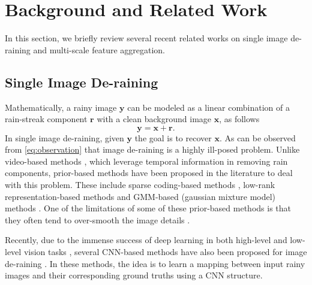 \documentclass[10pt,twocolumn,letterpaper]{article}
\begin{document}
\section{Background and Related Work}\label{sec:related}
In this section, we briefly review several recent related
works on single image de-raining and multi-scale feature aggregation.  

\subsection{Single Image De-raining}
Mathematically, a rainy image $\mathbf{y}$ can be modeled as  a linear combination of a rain-streak component $\mathbf{r}$ with a clean background image $\mathbf{x}$, as follows
\begin{equation}\label{eq:observation}
\mathbf{y}=\mathbf{x}+\mathbf{r}.
\end{equation}
In single image de-raining, given $\mathbf{y}$ the goal is to recover $\mathbf{x}$.   As can be observed from \eqref{eq:observation} that image de-raining is a highly ill-posed problem. Unlike video-based methods \cite{derain_cvpr17_video,derain_iccv17_video,derain_video_ijcv}, which leverage temporal information in removing rain components,  prior-based methods have been proposed in the literature to deal with this problem.  These include sparse coding-based methods \cite{derain_tip12,derain_tip14, derain_iccv17}, low-rank representation-based methods \cite{derain_lowrank,derain_csc_17} and GMM-based (gaussian mixture model) methods \cite{rain_2016_gmm}.  One of the limitations of some of these prior-based methods is that they often tend to over-smooth the image details \cite{derain_tip12,derain_csc_17}.   



Recently, due to the immense success of deep learning in both high-level and low-level vision tasks \cite{deep_residue,tao_stackgan_cvpr2018, zizhao_mdnet,peng_iccv17, jia_differ, style_hang},  several CNN-based methods have also been proposed for image de-raining \cite{cnn_derain2,derain_tip17,derain_cvpr2017_multi,derain_cvpr2017}.   In these methods, the idea is to learn a mapping  between input rainy images and their corresponding ground
truths using a CNN structure.  
\end{document}
